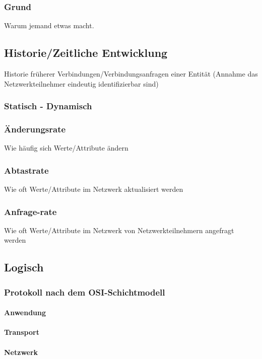 \subsubsection{Grund}
Warum jemand etwas macht.

\subsection{Historie/Zeitliche Entwicklung}
Historie früherer Verbindungen/Verbindungsanfragen einer Entität (Annahme das Netzwerkteilnehmer eindeutig identifizierbar sind)
\subsubsection{Statisch - Dynamisch}

\subsubsection{Änderungsrate} 
    Wie häufig sich Werte/Attribute ändern
\subsubsection{Abtastrate}
    Wie oft Werte/Attribute im Netzwerk aktualisiert werden
\subsubsection{Anfrage-rate}
    Wie oft Werte/Attribute im Netzwerk von Netzwerkteilnehmern angefragt werden

\subsection{Logisch}

\subsubsection{Protokoll nach dem OSI-Schichtmodell}

\paragraph{Anwendung}
\paragraph{Transport}
\paragraph{Netzwerk}


